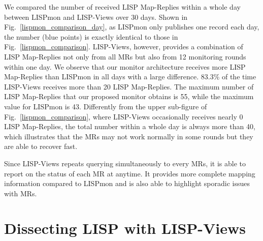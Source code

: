 We compared the number of received LISP Map-Replies within a whole day between LISPmon and LISP-Views over 30 days. Shown in Fig.~\ref{lispmon_comparison_day}, as LISPmon only publishes one record each day, the number (blue points) is exactly identical to those in Fig.~\ref{lispmon_comparison}. LISP-Views, however, provides a combination of LISP Map-Replies not only from all MRs but also from 12 monitoring rounds within one day. We observe that our monitor architecture receives more LISP Map-Replies than LISPmon in all days with a large difference. 83.3\% of the time LISP-Views receives more than 20 LISP Map-Replies. The maximum number of LISP Map-Replies that our proposed monitor obtains is 55, while the maximum value for LISPmon is 43. Differently from the upper sub-figure of Fig.~\ref{lispmon_comparison}, where LISP-Views occasionally receives nearly 0 LISP Map-Replies, the total number within a whole day is always more than 40, which illustrates that the MRs may not work normally in some rounds but they are able to recover fast. 

Since LISP-Views repeats querying simultaneously to every MRs, it is able to report on the status of each MR at anytime. It provides more complete mapping information compared to LISPmon and is also able to highlight sporadic issues with MRs.


\section{Dissecting LISP with LISP-Views}
\label{sec:lispviews_results}


